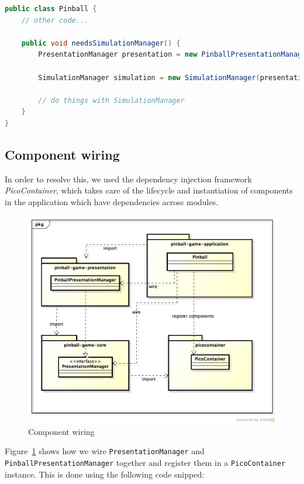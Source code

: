 \documentclass[fontsize=12pt,
               paper=a4,
               twoside=false,
               parskip=half,
               ]{scrartcl}
\begin{document}
\begin{lstlisting}[language=Java,label=lst:no_dependency_injection,caption={no dependency injection}]
public class Pinball {
	// other code...

	public void needsSimulationManager() {
		PresentationManager presentation = new PinballPresentationManager();

		SimulationManager simulation = new SimulationManager(presentation);

		// do things with SimulationManager
	}
}
\end{lstlisting}

\subsection{Component wiring}

In order to resolve this, we used the dependency injection framework \emph{PicoContainer}, which takes care of the lifecycle and instantiation of components in the application which have dependencies across modules.

\begin{figure}[H]
	\centering
	\includegraphics[width=15.5cm]{./img/dependency-injection2.png}
	\caption[Component wiring]{Component wiring}
	\label{fig:dependency_injection2}
\end{figure}

Figure~\ref{fig:dependency_injection2} shows how we wire \texttt{PresentationManager} and \texttt{PinballPresentationManager} together and register them in a \texttt{PicoContainer} instance. This is done using the following code snipped:
\end{document}
